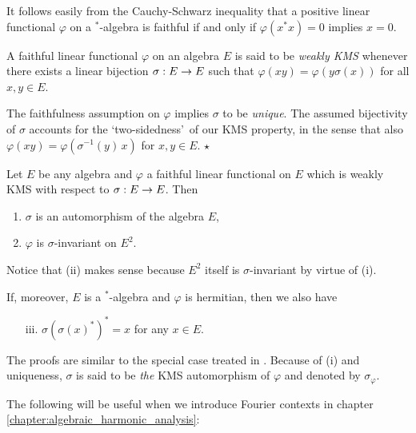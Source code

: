 It follows easily from the Cauchy-Schwarz inequality that a positive linear
functional $\varphi$ on a $^*$-algebra is faithful if and only if $\varphi(x^*x) = 0$
implies $x=0$.
\vspace{2ex}


\begin{defn_sec} \label{def:KMS}
A faithful linear functional $\varphi$ on an algebra $E$ is said to be
{\em weakly {\scriptsize KMS}\/}
whenever there exists a linear bijection $\sigma : E \rightarrow E$ such that
$\varphi(xy) = \varphi(y \sigma(x))$ for all $x,y \in E$.
\end{defn_sec}


\begin{remark_sec} \rm
The faithfulness assumption on $\varphi$ implies $\sigma$ to be {\em unique}.
The assumed bijectivity of $\sigma$ accounts for the \lq two-sidedness\rq\ of
our {\scriptsize KMS} property, in the sense that also
$\varphi(xy) = \varphi(\sigma^{-1}(y)\, x)$ for $x,y \in E$.
\hfill $\star$
\end{remark_sec}

\begin{prop_sec}  \label{prop:KMS}
Let\/ $E$ be any algebra and\/ $\varphi$ a faithful linear functional on\/ $E$
which is weakly {\scriptsize KMS} with respect to\/ $\sigma : E \rightarrow E$.
Then
\begin{enumerate}
\item $\sigma$ is an automorphism of the algebra\/ $E$,
\item $\varphi$ is\/ $\sigma$-invariant on\/ $E^2$.
\end{enumerate}
{\rm Notice that (ii) makes sense because $E^2$ itself is $\sigma$-invariant by virtue of (i).}

If, moreover, $E$ is a $^*$-algebra and\/ $\varphi$ is hermitian, then we also have
\begin{enumerate}
\item[iii.] $\sigma(\sigma(x)^*)^* = x$ for any\/ $x\in E$.
\end{enumerate}
\end{prop_sec}

The proofs are similar to the special case treated in \cite{Fons:AFGD}\@.
Because of (i) and uniqueness, $\sigma$ is said to be {\em the\/} {\scriptsize KMS}
automorphism of $\varphi$ and denoted by $\sigma_\varphi$.
\vspace{2ex}


The following will be useful when we introduce Fourier contexts
in chapter \ref{chapter:algebraic_harmonic_analysis}:


